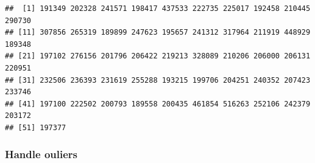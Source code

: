 \documentclass[
]{article}
\newenvironment{Shaded}{\begin{snugshade}}{\end{snugshade}}
\newcommand{\CommentTok}[1]{\textcolor[rgb]{0.56,0.35,0.01}{\textit{#1}}}
\newcommand{\FloatTok}[1]{\textcolor[rgb]{0.00,0.00,0.81}{#1}}
\newcommand{\FunctionTok}[1]{\textcolor[rgb]{0.13,0.29,0.53}{\textbf{#1}}}
\newcommand{\NormalTok}[1]{#1}
\newcommand{\OtherTok}[1]{\textcolor[rgb]{0.56,0.35,0.01}{#1}}
\newcommand{\SpecialCharTok}[1]{\textcolor[rgb]{0.81,0.36,0.00}{\textbf{#1}}}
\begin{document}
\begin{Shaded}
\end{Shaded}

\begin{verbatim}
##  [1] 191349 202328 241571 198417 437533 222735 225017 192458 210445 290730
## [11] 307856 265319 189899 247623 195657 241312 317964 211919 448929 189348
## [21] 197102 276156 201796 206422 219213 328089 210206 206000 206131 220951
## [31] 232506 236393 231619 255288 193215 199706 204251 240352 207423 233746
## [41] 197100 222502 200793 189558 200435 461854 516263 252106 242379 203172
## [51] 197377
\end{verbatim}

\subsubsection{Handle ouliers}\label{handle-ouliers-4}

\begin{Shaded}
\end{Shaded}
\end{document}
